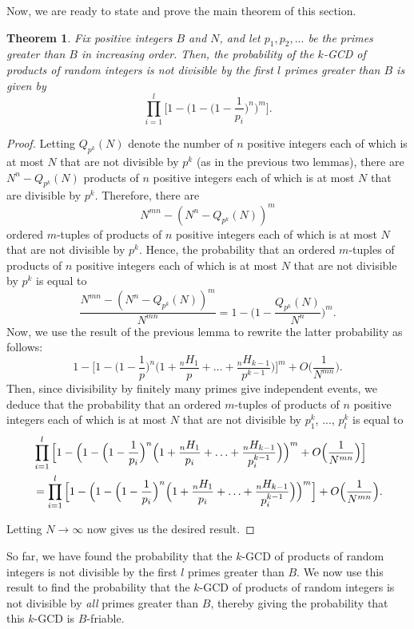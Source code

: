 \documentclass[10pt,a4paper]{article}
\newtheorem{theorem}{Theorem}[section]
\theoremstyle{definition}
\theoremstyle{remark}
\begin{document}
Now, we are ready to state and prove the main theorem of this section.

\begin{theorem}
Fix positive integers $B$ and $N$, and let $p_1, p_2, ...$ be the primes greater than $B$ in increasing order. Then, the probability of the $k$-GCD of products of random integers is not divisible by the first $l$ primes greater than $B$ is given by 
$$\prod_{i=1}^{l} \Big[1 - \Big(1 - \Big(1-\frac{1}{p_i}\Big)^n\Big)^m\Big].$$
\end{theorem}

\begin{proof}
Letting $Q_{p^k}(N)$ denote the number of $n$ positive integers each of which is at most $N$ that are not divisible by $p^k$ (as in the previous two lemmas), there are $N^n - Q_{p^k}(N)$ products of $n$ positive integers each of which is at most $N$ that are divisible by $p^k$. Therefore, there are 
$$N^{mn} - (N^n - Q_{p^k}(N))^m$$
ordered $m$-tuples of products of $n$ positive integers each of which is at most $N$ that are not divisible by $p^k$.
Hence, the probability that an ordered $m$-tuples of products of $n$ positive integers each of which is at most $N$ that are not divisible by $p^k$ is equal to
$$\frac{N^{mn} - (N^n - Q_{p^k}(N))^m}{N^{mn}} = 1 - \Big(1 - \frac{Q_{p^k}(N)}{N^n}\Big)^m.$$
Now, we use the result of the previous lemma to rewrite the latter probability as follows:
$$1 - \Big[1 - \Big(1 - \frac{1}{p}\Big)^n \Big(1 + \frac{{}_nH_1}{p} + ... + \frac{{}_nH_{k-1}}{p^{k-1}}\Big)\Big]^m + O\Big(\frac{1}{N^{mn}}\Big).$$
Then, since divisibility by finitely many primes give independent events, we deduce that the probability that an ordered $m$-tuples of products of $n$ positive integers each of which is at most $N$ that are not divisible by $p_1^k$, ..., $p_l^k$ is equal to
\begin{align*} &\prod_{i=1}^l \Big[1 - \Big(1 -\Big(1-\frac{1}{p_i}\Big)^n\Big(1+\frac{{}_nH_1}{p_i}+\mathellipsis+\frac{{}_nH_{k-1}}{p_i^{k-1}}\Big)\Big)^m +O\Big(\frac{1}{N^{mn}}\Big) \Big]\\
&=\prod_{i=1}^l \Big[1 - \Big(1 -\Big(1-\frac{1}{p_i}\Big)^n\Big(1+\frac{{}_nH_1}{p_i}+\mathellipsis+\frac{{}_nH_{k-1}}{p_i^{k-1}}\Big)\Big)^m\Big] + O\Big(\frac{1}{N^{mn}}\Big). \end{align*}

\noindent Letting $N \to \infty$ now gives us the desired result.
\end{proof}

So far, we have found the probability that the $k$-GCD of products of random integers is not divisible by the first \(l\) primes greater than \(B\). We now use this result to find the probability that the $k$-GCD of products of random integers is not divisible by \textit{all} primes greater than $B$, thereby giving the probability that this $k$-GCD is $B$-friable.
\end{document}

